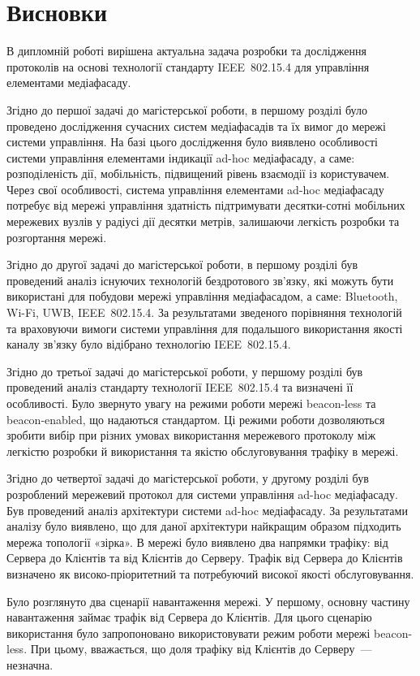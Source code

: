 \documentclass[a4paper,ukrainian,utf8,nocolumnsxix,floatsection,equationsection]{eskdtext}
\newcommand{\sectionnonum}[1]{\section*{#1}\addcontentsline{toc}{section}{#1}}
\newcommand{\iee}[0]{IEEE~802.15.4\xspace}
\newcommand{\blm}[0]{beacon-less\xspace}
\newcommand{\bem}[0]{beacon-enabled\xspace}
\begin{document}
\sectionnonum{Висновки}

В дипломній роботі вирішена актуальна задача розробки та дослідження протоколів на основі технології стандарту \iee для управління елементами медіафасаду.

Згідно до першої задачі до магістерської роботи, в першому розділі було проведено дослідження сучасних систем медіафасадів та їх вимог до мережі системи управління. На базі цього дослідження було виявлено особливості системи управління елементами індикації ad-hoc медіафасаду, а саме: розподіленість дії, мобільність, підвищений рівень взаємодії із користувачем. Через свої особливості, система управління елементами ad-hoc медіафасаду потребує від мережі управління здатність підтримувати десятки-сотні мобільних мережевих вузлів у радіусі дії десятки метрів, залишаючи легкість розробки та розгортання мережі.

Згідно до другої задачі до магістерської роботи, в першому розділі був проведений аналіз існуючих технологій бездротового зв’язку, які можуть бути використані для побудови мережі управління медіафасадом, а саме: Bluetooth, Wi-Fi, UWB, \iee. За результатами зведеного порівняння технологій та враховуючи вимоги системи управління для подальшого використання  якості каналу зв'язку було відібрано технологію \iee.

Згідно до третьої задачі до магістерської роботи, у першому розділі був проведений аналіз стандарту технології \iee та визначені її особливості. Було звернуто увагу на режими роботи мережі \blm та \bem, що надаються стандартом. Ці режими роботи дозволяються зробити вибір при різних умовах використання мережевого протоколу між легкістю розробки й використання та якістю обслуговування трафіку в мережі.

Згідно до четвертої задачі до магістерської роботи, у другому розділі був розроблений мережевий  протокол для системи управління ad-hoc медіафасаду. Був проведений аналіз архітектури системи ad-hoc медіафасаду. За результатами аналізу було виявлено, що для даної архітектури найкращим образом підходить мережа топології «зірка». В мережі було виявлено два напрямки трафіку: від Сервера до Клієнтів та від Клієнтів до Серверу. Трафік від Сервера до Клієнтів визначено як високо-пріоритетний та потребуючий високої якості обслуговування.

Було розглянуто два сценарії навантаження мережі. У першому, основну частину навантаження займає трафік від Сервера до Клієнтів. Для цього сценарію використання було запропоновано використовувати режим роботи мережі \blm. При цьому, вважається, що доля трафіку від Клієнтів до Серверу~--- незначна.
\end{document}
